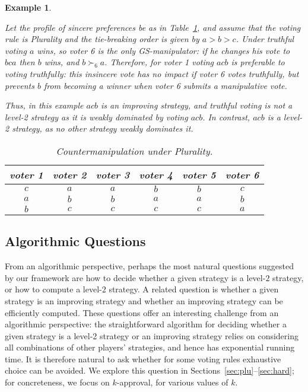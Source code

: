 \documentclass[11pt]{article}
\newtheorem{example}{Example}
\begin{document}
\begin{example}\label{ex:counter}
{\em
Let the profile of sincere preferences be as in Table~\ref{table:example2}, and assume that 
the voting rule is Plurality and the tie-breaking order is given by $a>b>c$. 
Under truthful voting $a$ wins, so voter 6 is the only GS-manipulator: if he changes his vote
to $bca$ then $b$ wins, and $b\succ_6 a$. Therefore, for voter 1 voting $acb$ is preferable to voting truthfully:
this insincere vote has no impact if voter 6 votes truthfully, but prevents $b$ from becoming a winner when voter 6
submits a manipulative vote. 

Thus, in this example $acb$ is an improving strategy, 
and truthful voting is not a level-2 strategy as it is weakly dominated
by voting $acb$. In contrast, $acb$ is a level-2 strategy, as no other strategy weakly dominates it.

\begin{table}[h]
\begin{center}
\begin{tabular}{c|c|c|c|c|c}
voter 1&voter 2&voter 3&voter 4 &voter 5 &voter 6\\
\midrule
$c$&$a$&$a$&$b$&$b$&$c$\\
$a$&$b$&$b$&$a$&$a$&$b$\\
$b$&$c$&$c$&$c$&$c$&$a$\\
\end{tabular}
\caption{Countermanipulation under Plurality.}\label{table:example2}
\end{center}
\end{table}
}
\end{example}


\subsection{Algorithmic Questions}
From an algorithmic perspective, perhaps the most natural questions 
suggested by our framework are how to decide whether a given strategy
is a level-$2$ strategy, or how to compute a level-$2$ strategy.
A related question is whether a given strategy is an improving strategy
and whether an improving strategy can be efficiently computed.
These questions offer an interesting challenge from an algorithmic perspective:
the straightforward algorithm for deciding whether a given strategy is a level-2 strategy
or an improving strategy relies on considering all combinations of other players' strategies,
and hence has exponential running time. It is therefore natural to ask 
whether for some voting rules exhaustive choice can be avoided.
We explore this question in Sections~\ref{sec:plu}--\ref{sec:hard};
for concreteness, we focus on $k$-approval, for various values of $k$.
\end{document}
